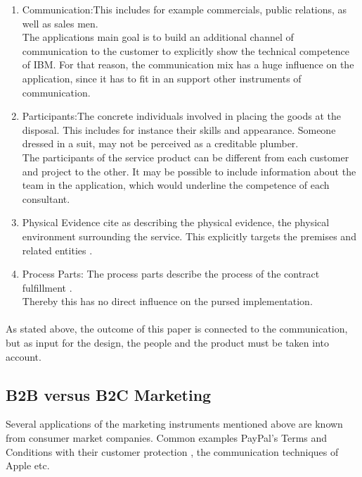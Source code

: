 \begin{enumerate}
    \item{Communication:}This includes for example commercials, public relations, as well as sales men. \\
    The applications main goal is to build an additional channel of communication to the customer to explicitly show the technical competence of IBM. For that reason, the communication mix has a huge influence on the application, since it has to fit in an support other instruments of communication.
    \item{Participants:}The concrete individuals involved in placing the goods at the disposal. This includes for instance their skills and appearance. Someone dressed in a suit, may not be perceived as a creditable plumber. \\ 
    The participants of the service product can be different from each customer and project to the other. It may be possible to include information about the team in the application, which would underline the competence of each consultant.
    \item{Physical Evidence}
    \textcite[155]{AzilaGbettor2013} cite \textcite{Booms.1981} as describing the physical evidence, the physical environment surrounding the service. This explicitly targets the premises and related entities \parencite[cf.]{Hoepner2015}.
    \item{Process Parts:}
    The process parts describe the process of the contract fulfillment \parencite{Hoepner2015}.\\
    Thereby this has no direct influence on the pursed implementation. 
\end{enumerate}
\paragraph*{} As stated above, the outcome of this paper is connected to the communication, but as input for the design, the people and the product must be taken into account. 
\subsection{B2B versus B2C Marketing}
Several applications of the marketing instruments mentioned above are known from consumer market companies. Common examples PayPal's Terms and Conditions with their customer protection \parencite[see][]{PayPal}, the communication techniques of Apple etc.

